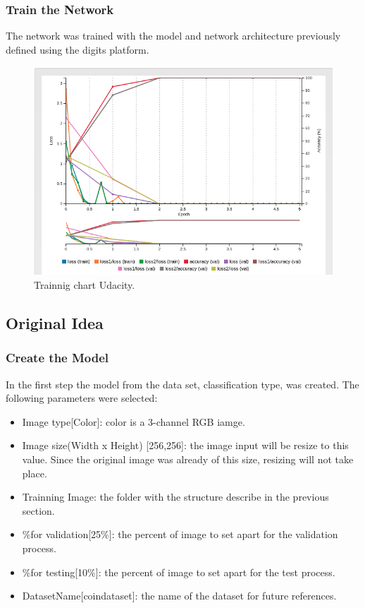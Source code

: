 \documentclass[10pt,journal,compsoc]{IEEEtran}
\begin{document}
\subsubsection{Train the Network}

The network was trained with the model and network architecture previously defined using the digits platform.

\begin{figure}[h]
\centering
\includegraphics[scale=0.3]{trainning-chart}
\caption{Trainnig chart Udacity.}
\label{fig:figure3}
\end{figure}


\subsection{Original Idea}
\subsubsection{Create the Model}

In the first step the model from the data set, classification type, was created. The following parameters were selected:

\begin{itemize}
\item Image type[Color]: color is a  3-channel RGB iamge.
\item Image size(Width x Height) [256,256]: the image input will be resize to this value. Since the original image was already of this size, resizing will not take place.
\item Trainning Image: the folder with the structure describe in the previous section. 
\item \%for validation[25\%]: the percent of image to set apart for the validation process.
\item \%for testing[10\%]: the percent of image to set apart for the test process.
\item DatasetName[coin\-dataset]: the name of the dataset for future references.
\end{itemize}
\end{document}
